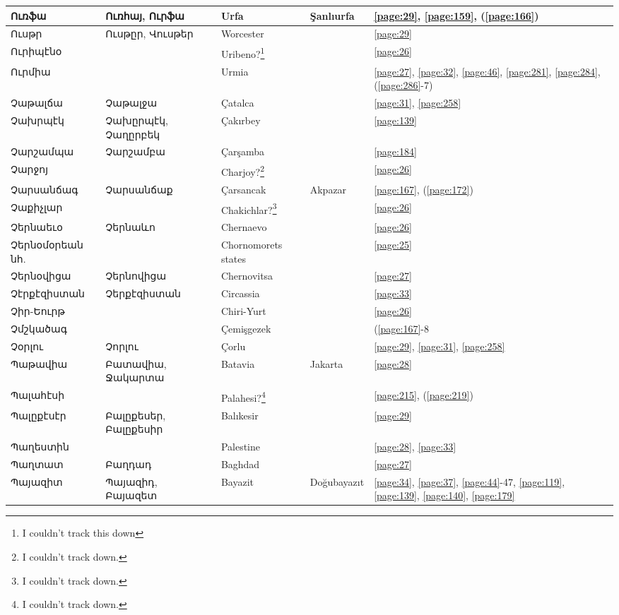 \begin{center}
\begin{longtable}{|p{}|p{3cm}|p{3cm}|p{2cm}|p{3cm}|}
Ուռֆա&   Ուռհայ, Ուրֆա & Urfa&Şanlıurfa &\ref{page:29}, \ref{page:159}, (\ref{page:166})\\ \hline
Ուսթր& Ուսթըր, Վուսթեր &Worcester & &\ref{page:29}\\ \hline
Ուրիպէնօ& &Uribeno?\footnote{I couldn't track this down} & &\ref{page:26}\\ \hline
Ուրմիա& &Urmia & &\ref{page:27}, \ref{page:32}, \ref{page:46}, \ref{page:281}, \ref{page:284}, (\ref{page:286}-7)\\ \hline
Չաթալճա&  Չաթալջա  &Çatalca & &\ref{page:31}, \ref{page:258}\\ \hline
Չախրպէկ&Չախըրպէկ, Չաղըրբեկ & Çakırbey& &\ref{page:139}\\ \hline
Չարշամպա&Չարշամբա &Çarşamba & &\ref{page:184}\\ \hline
Չարջոյ& & Charjoy?\footnote{I couldn't track down.}& &\ref{page:26}\\ \hline
Չարսանճագ& Չարսանճաք&Çarsancak &Akpazar &\ref{page:167}, (\ref{page:172})\\ \hline
Չաքիչլար& &Chakichlar?\footnote{I couldn't track down. } & &\ref{page:26}\\ \hline
Չերնաեւօ&Չերնաևո & Chernaevo& &\ref{page:26}\\ \hline
Չերնօմօրեան նհ.& &Chornomorets states & &\ref{page:25}\\ \hline
Չերնօվիցա&Չերնովիցա & Chernovitsa& &\ref{page:27}\\ \hline
Չէրքէզիստան&Չերքէզիստան& Circassia& &\ref{page:33}\\ \hline
Չիր-Եուրթ&& Chiri-Yurt&  &\ref{page:26}\\ \hline
Չմշկածագ& & Çemişgezek& &(\ref{page:167}-8\\ \hline
Չօրլու& Չորլու&Çorlu & &\ref{page:29}, \ref{page:31}, \ref{page:258}\\ \hline
Պաթավիա& Բատավիա, Ջակարտա&  Batavia&Jakarta &\ref{page:28}\\ \hline
Պալահէսի& &Palahesi?\footnote{I couldn't track down.} & &\ref{page:215}, (\ref{page:219})\\ \hline
Պալըքէսէր&  Բալըքեսեր, Բալըքեսիր&Balıkesir & &\ref{page:29}\\ \hline
Պաղեստին& &Palestine & &\ref{page:28}, \ref{page:33}\\ \hline
Պաղտատ& Բաղդադ&Baghdad & &\ref{page:27}\\ \hline
Պայազիտ&Պայազիդ, Բայազետ &  Bayazit  & Doğubayazıt &\ref{page:34}, \ref{page:37}, \ref{page:44}-47, \ref{page:119}, \ref{page:139}, \ref{page:140}, \ref{page:179}\\ \hline

\end{longtable}
\end{center}

